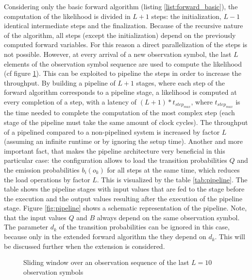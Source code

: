 \documentclass[mscthesis]{usiinfthesis}
\begin{document}
Considering only the basic forward algorithm (listing
\ref{list:forward_basic}), the computation of the likelihood is divided in
$L+1$ steps: the initialization, $L-1$ identical intermediate steps and the
finalization. Because of the recursive nature of the algorithm, all steps
(except the initialization) depend on the previously computed forward
variables. For this reason a direct parallelization of the steps is not
possible. However, at every arrival of a new observation symbol, the last $L$
elements of the observation symbol sequence are used to compute the likelihood
(cf figure \ref{fig:sliding}). This can be exploited to pipeline the steps in
order to increase the throughput. By building a pipeline of $L+1$ stages, where
each step of the forward algorithm corresponds to a pipeline stage,
a likelihood is computed at every completion of a step, with a latency of
$(L+1)*t_{step_{max}}$, where $t_{step_{max}}$ is the time needed to complete
the computation of the most complex step (each stage of the pipeline must take
the same amount of clock cycles). The throughput of a pipelined compared to
a non-pipelined system is increased by factor $L$ (assuming an infinite runtime
or by ignoring the setup time). Another and more important fact, that makes the
pipeline architecture very beneficial in this particular case: the
configuration allows to load the transition probabilities $Q$ and the emission
probabilities $b_i(o_k)$ for all steps at the same time, which reduces the load
operations by factor $L$. This is visualized by the table \ref{tab:pipeline}.
The table shows the pipeline stages with input values that are fed to the stage
before the execution and the output values resulting after the execution of
the pipeline stage. Figure \ref{fig:pipeline} shows a schematic representation
of the pipeline. Note, that the input values $Q$ and $B$ always depend on
the same observation symbol. The parameter $d_k$ of the transition
probabilities can be ignored in this case, because only in the extended forward
algorithm the they depend on $d_k$. This will be discussed further when the
extension is considered.

\begin{figure}
    \centering
    
    \caption{Sliding window over an observation sequence of the
        last $L=10$ observation symbols}
    \label{fig:sliding}
\end{figure}
\end{document}
